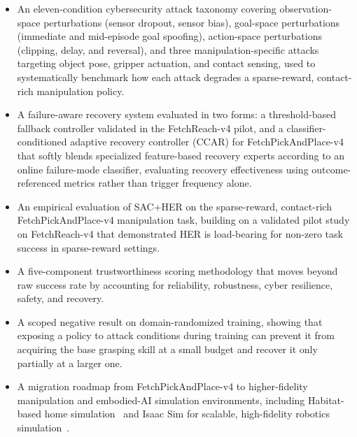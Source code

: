 \documentclass[conference]{IEEEtran}
\begin{document}
\begin{itemize}
    \item An eleven-condition cybersecurity attack taxonomy covering observation-space
          perturbations (sensor dropout, sensor bias), goal-space perturbations
          (immediate and mid-episode goal spoofing), action-space perturbations
          (clipping, delay, and reversal), and three manipulation-specific attacks
          targeting object pose, gripper actuation, and contact sensing, used to
          systematically benchmark how each attack degrades a sparse-reward,
          contact-rich manipulation policy.

    \item A failure-aware recovery system evaluated in two forms: a threshold-based
          fallback controller validated in the FetchReach-v4 pilot, and a
          classifier-conditioned adaptive recovery controller (CCAR) for
          FetchPickAndPlace-v4 that softly blends specialized feature-based recovery
          experts according to an online failure-mode classifier, evaluating recovery
          effectiveness using outcome-referenced metrics rather than trigger frequency
          alone.

    \item An empirical evaluation of SAC+HER on the sparse-reward, contact-rich
          FetchPickAndPlace-v4 manipulation task, building on a validated pilot study
          on FetchReach-v4 that demonstrated HER is load-bearing for non-zero task
          success in sparse-reward settings.

    \item A five-component trustworthiness scoring methodology that moves beyond
          raw success rate by accounting for reliability, robustness, cyber resilience,
          safety, and recovery.

    \item A scoped negative result on domain-randomized training, showing that
          exposing a policy to attack conditions during training can prevent it from
          acquiring the base grasping skill at a small budget and recover it only
          partially at a larger one.

    \item A migration roadmap from FetchPickAndPlace-v4 to higher-fidelity manipulation
          and embodied-AI simulation environments, including Habitat-based home
          simulation~\cite{puig2023habitat3} and Isaac Sim for scalable, high-fidelity
          robotics simulation~\cite{nvidia2026isaacsim}.
\end{itemize}
\end{document}
